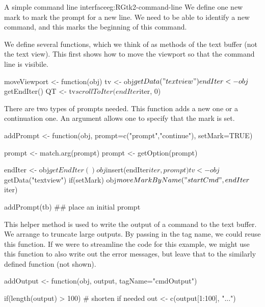\begin{example}{A simple command line interface}{eg:RGtk2-command-line}
We define one new mark to mark the prompt for a new line. We
need to be able to identify a new command, and this marks the
beginning of this command.
\begin{Schunk}
\end{Schunk}

We define several functions, which we think of as methods of the text
buffer (not the text view). This first shows how to move the viewport
so that the command line is visibile.
\begin{Schunk}
\begin{Sinput}
 moveViewport <- function(obj) {
   tv <- obj$getData("textview")
   endIter <- obj$getEndIter()
   QT <- tv$scrollToIter(endIter$iter, 0)
 }
\end{Sinput}
\end{Schunk}

There are two types of prompts needed. This function adds a new one or a
continuation one. An argument allows one to specify that the
 mark is set.
\begin{Schunk}
\begin{Sinput}
 addPrompt <- function(obj, prompt=c("prompt","continue"), 
                       setMark=TRUE) {
   prompt <- match.arg(prompt)
   prompt <- getOption(prompt)
   
   endIter <- obj$getEndIter()
   obj$insert(endIter$iter, prompt)
   tv <- obj$getData("textview")
   if(setMark)
     obj$moveMarkByName("startCmd", endIter$iter)
 }
 addPrompt(tb) ## place an initial prompt
\end{Sinput}
\end{Schunk}

This helper method is used to write the output of a command to the
text buffer. We arrange to truncate large outputs. By passing in the
tag name, we could reuse this function. If we were to streamline the
code for this example, we might use this function to also write out the error
messages, but leave that to the similarly defined function
 (not shown).


\begin{Schunk}
\begin{Sinput}
 addOutput <- function(obj, output, tagName="cmdOutput") {
   if(length(output) > 100)              # shorten if needed
     out <- c(output[1:100], "...")
 
}
\end{Sinput}
\end{Schunk}
\end{example}
